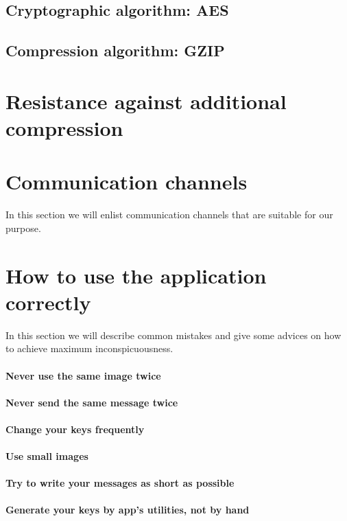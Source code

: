 \subsection{Cryptographic algorithm: AES}

\subsection{Compression algorithm: GZIP}


\section{Resistance against additional compression}


\section{Communication channels}
In this section we will enlist communication channels that are suitable for our purpose.

\section{How to use the application correctly}
In this section we will describe common mistakes and give some advices on
how to achieve maximum inconspicuousness.

\paragraph{Never use the same image twice}

\paragraph{Never send the same message twice}

\paragraph{Change your keys frequently}

\paragraph{Use small images}

\paragraph{Try to write your messages as short as possible}

\paragraph{Generate your keys by app's utilities, not by hand}

